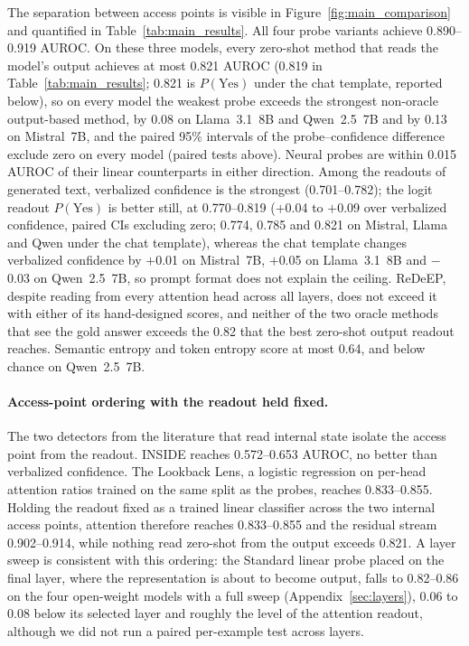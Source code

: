 \documentclass[acmsmall,screen,review]{acmart}
\begin{document}
The separation between access points is visible in Figure~\ref{fig:main_comparison} and quantified in Table~\ref{tab:main_results}. All four probe variants achieve 0.890--0.919 AUROC. On these three models, every zero-shot method that reads the model's output achieves at most 0.821 AUROC (0.819 in Table~\ref{tab:main_results}; 0.821 is $P(\text{Yes})$ under the chat template, reported below), so on every model the weakest probe exceeds the strongest non-oracle output-based method, by 0.08 on Llama~3.1~8B and Qwen~2.5~7B and by 0.13 on Mistral~7B, and the paired 95\% intervals of the probe--confidence difference exclude zero on every model (paired tests above). Neural probes are within 0.015 AUROC of their linear counterparts in either direction. Among the readouts of generated text, verbalized confidence is the strongest (0.701--0.782); the logit readout $P(\text{Yes})$ is better still, at 0.770--0.819 ($+$0.04 to $+$0.09 over verbalized confidence, paired CIs excluding zero; 0.774, 0.785 and 0.821 on Mistral, Llama and Qwen under the chat template), whereas the chat template changes verbalized confidence by $+$0.01 on Mistral~7B, $+$0.05 on Llama~3.1~8B and $-$0.03 on Qwen~2.5~7B, so prompt format does not explain the ceiling. ReDeEP, despite reading from every attention head across all layers, does not exceed it with either of its hand-designed scores, and neither of the two oracle methods that see the gold answer exceeds the 0.82 that the best zero-shot output readout reaches. Semantic entropy and token entropy score at most 0.64, and below chance on Qwen~2.5~7B.

\paragraph{Access-point ordering with the readout held fixed.}
The two detectors from the literature that read internal state isolate the access point from the readout. INSIDE reaches 0.572--0.653 AUROC, no better than verbalized confidence. The Lookback Lens, a logistic regression on per-head attention ratios trained on the same split as the probes, reaches 0.833--0.855. Holding the readout fixed as a trained linear classifier across the two internal access points, attention therefore reaches 0.833--0.855 and the residual stream 0.902--0.914, while nothing read zero-shot from the output exceeds 0.821. A layer sweep is consistent with this ordering: the Standard linear probe placed on the final layer, where the representation is about to become output, falls to 0.82--0.86 on the four open-weight models with a full sweep (Appendix~\ref{sec:layers}), 0.06 to 0.08 below its selected layer and roughly the level of the attention readout, although we did not run a paired per-example test across layers.
\end{document}
